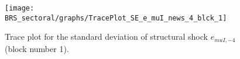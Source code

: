 \begin{figure}[H]
\centering
  \texttt{[image: BRS\_sectoral/graphs/TracePlot\_SE\_e\_muI\_news\_4\_blck\_1]}\\
    \caption{Trace plot for the standard deviation of structural shock ${e_{muI,-4}}$ (block number 1).}
\end{figure}
